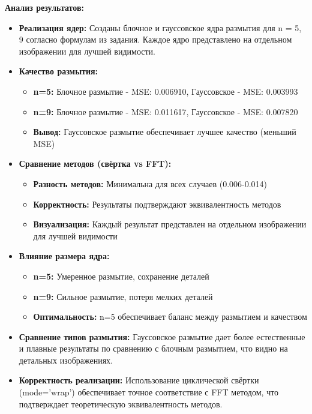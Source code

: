 \textbf{Анализ результатов:}
\begin{itemize}
    \item \textbf{Реализация ядер:} Созданы блочное и гауссовское ядра размытия для n = 5, 9 согласно формулам из задания. Каждое ядро представлено на отдельном изображении для лучшей видимости.
    
    \item \textbf{Качество размытия:} 
    \begin{itemize}
        \item \textbf{n=5:} Блочное размытие - MSE: 0.006910, Гауссовское - MSE: 0.003993
        \item \textbf{n=9:} Блочное размытие - MSE: 0.011617, Гауссовское - MSE: 0.007820
        \item \textbf{Вывод:} Гауссовское размытие обеспечивает лучшее качество (меньший MSE)
    \end{itemize}
    
    \item \textbf{Сравнение методов (свёртка vs FFT):} 
    \begin{itemize}
        \item \textbf{Разность методов:} Минимальна для всех случаев (0.006-0.014)
        \item \textbf{Корректность:} Результаты подтверждают эквивалентность методов
        \item \textbf{Визуализация:} Каждый результат представлен на отдельном изображении для лучшей видимости
    \end{itemize}
    
    \item \textbf{Влияние размера ядра:} 
    \begin{itemize}
        \item \textbf{n=5:} Умеренное размытие, сохранение деталей
        \item \textbf{n=9:} Сильное размытие, потеря мелких деталей
        \item \textbf{Оптимальность:} n=5 обеспечивает баланс между размытием и качеством
    \end{itemize}
    
    \item \textbf{Сравнение типов размытия:} Гауссовское размытие дает более естественные и плавные результаты по сравнению с блочным размытием, что видно на детальных изображениях.
    
    \item \textbf{Корректность реализации:} Использование циклической свёртки (mode='wrap') обеспечивает точное соответствие с FFT методом, что подтверждает теоретическую эквивалентность методов.
\end{itemize}

